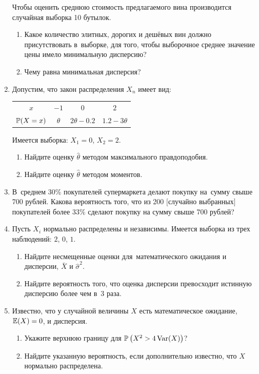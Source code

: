 \begin{enumerate}
Чтобы оценить среднюю стоимость предлагаемого вина производится
случайная выборка 10 бутылок.
\begin{enumerate}
\item Какое количество элитных, дорогих и дешёвых вин должно присутствовать в~выборке,
для того, чтобы выборочное среднее значение цены имело минимальную дисперсию?
\item Чему равна минимальная дисперсия?
\end{enumerate}

\item Допустим, что закон распределения $X_{n}$ имеет вид:

\begin{center}
\begin{tabular}{@{}cccc@{}}
\toprule
$x$      & $-1$     & $0$             & $2$             \\
$\P(X=x)$ & $\theta$ & $2\theta - 0.2$ & $1.2 - 3\theta$ \\ \bottomrule
\end{tabular}
\end{center}

Имеется выборка: $X_{1}=0$, $X_{2}=2$.
\begin{enumerate}
\item Найдите оценку $\hat{\theta}$ методом максимального правдоподобия.
\item Найдите оценку $\hat{\theta}$ методом моментов.
\end{enumerate}

\item В~среднем 30\% покупателей супермаркета делают покупку на~сумму свыше 700
рублей. Какова вероятность того, что из 200 $[$случайно выбранных$]$ покупателей
более 33\% сделают покупку на сумму свыше 700 рублей?

\item Пусть $X_{i}$ нормально распределены и независимы. Имеется выборка
из трех наблюдений: $2$, $0$, $1$.
\begin{enumerate}
\item Найдите несмещенные оценки для~математического ожидания и дисперсии, $\bar X$
и $\hat{\sigma}^{2}$.
\item Найдите вероятность того, что оценка дисперсии превосходит истинную дисперсию
более чем в~3 раза.
\end{enumerate}

\item Известно, что у случайной величины $X$ есть математическое ожидание, $\E(X)=0$,
и дисперсия.
\begin{enumerate}
\item Укажите верхнюю границу для $\P\left(X^{2}>4\Var(X)\right)$?
\item Найдите указанную вероятность, если дополнительно известно, что $X$ нормально
распределена.
\end{enumerate}


\end{enumerate}
